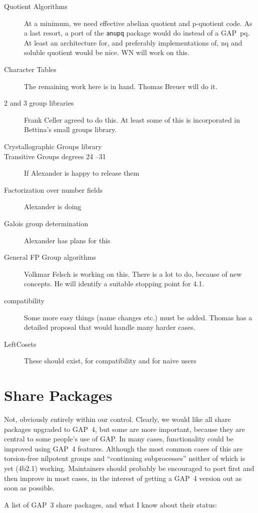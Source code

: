 \documentclass[12pt]{article}
\newcommand{\GAP}{\textsf{GAP}}
\newcommand{\bd}{\begin{description}}
\newcommand{\ed}{\end{description}}
\begin{document}
\bd
\item[Quotient Algorithms] At a minimum, we need effective abelian
quotient and p-quotient code. As a last resort, a port of the
\texttt{anupq} package would do instead of a \GAP\ pq. At least an
architecture for, and preferably implementations of, nq and soluble
quotient would be nice. WN will work on this.
\item[Character Tables] The remaining work here is in hand. Thomas
Breuer will do it.
\item[2 and 3 group libraries] Frank Celler agreed to do this. At
least some of this is incorporated in Bettina's small groups library.
\item[Crystallographic Groups library] 
\item[Transitive Groups degrees 24 --31] If Alexander is happy to
release them
\item[Factorization over number fields] Alexander is doing
\item[Galois group determination] Alexander has plans for this
\item[General FP Group algorithms] Volkmar Felsch is working on
this. There is a lot to do, because of new concepts.
He will identify a suitable stopping point for 4.1.
\item[compatibility] Some more easy things (name changes etc.) must be 
added. Thomas has a detailed proposal that would handle many harder cases.
\item[LeftCosets] These should exist, for compatibility and for naive users
\ed

\section{Share Packages}

Not, obviously entirely within our control. Clearly, we would like all
share packages upgraded to \GAP\ 4, but some are more important,
because they are central to some people's use of \GAP. In many cases,
functionality could be improved using \GAP\ 4 features. Although the
most common cases of this are torsion-free nilpotent groups and
``continuing subprocesses'' neither of which is yet (4b2.1) working. 
Maintainers
should probably be encouraged to port first and then improve in most
cases, in the interest of getting a \GAP\ 4 version out as soon as possible.

A list of \GAP\ 3 share packages, and what I know about their status:
\end{document}
